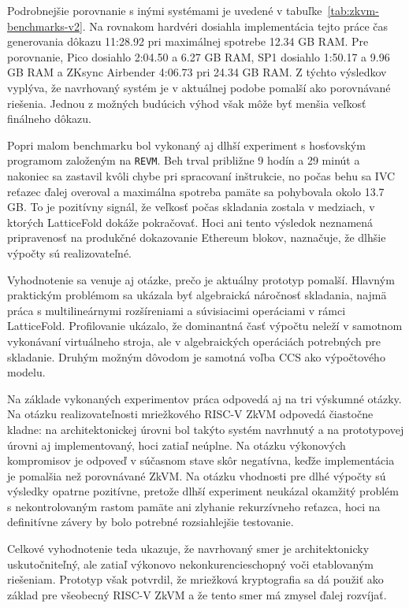 Podrobnejšie porovnanie s inými systémami je uvedené v tabuľke~\ref{tab:zkvm-benchmarks-v2}.
Na rovnakom hardvéri dosiahla implementácia tejto práce čas generovania dôkazu
11:28.92 pri maximálnej spotrebe 12.34 GB RAM. Pre porovnanie, Pico dosiahlo
2:04.50 a 6.27 GB RAM, SP1 dosiahlo 1:50.17 a 9.96 GB RAM a ZKsync Airbender
4:06.73 pri 24.34 GB RAM. Z týchto výsledkov vyplýva, že navrhovaný systém je v
aktuálnej podobe pomalší ako porovnávané riešenia. Jednou z možných budúcich
výhod však môže byť menšia veľkosť finálneho dôkazu.

Popri malom benchmarku bol vykonaný aj dlhší experiment s hosťovským programom
založeným na \texttt{REVM}. Beh trval približne 9 hodín a 29 minút a nakoniec sa
zastavil kvôli chybe pri spracovaní inštrukcie, no počas behu sa IVC reťazec ďalej
overoval a maximálna spotreba pamäte sa pohybovala okolo 13.7 GB. To je
pozitívny signál, že veľkosť počas skladania zostala v medziach, v ktorých LatticeFold
dokáže pokračovať. Hoci ani tento výsledok neznamená pripravenosť na produkčné
dokazovanie Ethereum blokov, naznačuje, že dlhšie výpočty sú realizovateľné.

Vyhodnotenie sa venuje aj otázke, prečo je aktuálny prototyp pomalší. Hlavným
praktickým problémom sa ukázala byť algebraická náročnosť skladania, najmä práca
s multilineárnymi rozšíreniami a súvisiacimi operáciami v rámci LatticeFold.
Profilovanie ukázalo, že dominantná časť výpočtu neleží v samotnom vykonávaní
virtuálneho stroja, ale v algebraických operáciách potrebných pre skladanie.
Druhým možným dôvodom je samotná voľba CCS ako výpočtového modelu.

Na základe vykonaných experimentov práca odpovedá aj na tri výskumné otázky.
Na otázku realizovateľnosti mriežkového RISC-V ZkVM odpovedá čiastočne kladne:
na architektonickej úrovni bol takýto systém navrhnutý a na prototypovej úrovni
aj implementovaný, hoci zatiaľ neúplne. Na otázku výkonových kompromisov je
odpoveď v súčasnom stave skôr negatívna, keďže implementácia je pomalšia než
porovnávané ZkVM. Na otázku vhodnosti pre dlhé výpočty sú výsledky opatrne
pozitívne, pretože dlhší experiment neukázal okamžitý problém s nekontrolovaným
rastom pamäte ani zlyhanie rekurzívneho reťazca, hoci na definitívne závery by
bolo potrebné rozsiahlejšie testovanie.

Celkové vyhodnotenie teda ukazuje, že navrhovaný smer je architektonicky
uskutočniteľný, ale zatiaľ výkonovo nekonkurencieschopný voči etablovaným
riešeniam. Prototyp však potvrdil, že mriežková kryptografia sa dá použiť ako
základ pre všeobecný RISC-V ZkVM a že tento smer má zmysel ďalej rozvíjať.

